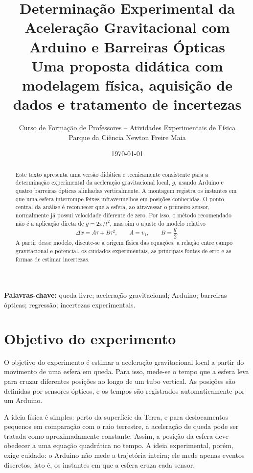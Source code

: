 \documentclass[11pt,a4paper]{article}
\title{\vspace{-1.0cm}\textbf{Determinação Experimental da Aceleração Gravitacional com Arduino e Barreiras Ópticas}\\[0.35em]
\large Uma proposta didática com modelagem física, aquisição de dados e tratamento de incertezas}
\author{Curso de Formação de Professores -- Atividades Experimentais de Física\\Parque da Ciência Newton Freire Maia}
\date{\today}
\begin{document}
\maketitle

\begin{abstract}
Este texto apresenta uma versão didática e tecnicamente consistente para a determinação experimental da aceleração gravitacional local, $g$, usando Arduino e quatro barreiras ópticas alinhadas verticalmente. A montagem registra os instantes em que uma esfera interrompe feixes infravermelhos em posições conhecidas. O ponto central da análise é reconhecer que a esfera, ao atravessar o primeiro sensor, normalmente já possui velocidade diferente de zero. Por isso, o método recomendado não é a aplicação direta de $g=2x/t^2$, mas sim o ajuste do modelo relativo
\[
\Delta x=A\tau+B\tau^2,
\qquad A=v_1,
\qquad B=\frac{g}{2}.
\]
A partir desse modelo, discute-se a origem física das equações, a relação entre campo gravitacional e potencial, os cuidados experimentais, as principais fontes de erro e as formas de estimar incertezas.
\end{abstract}

\textbf{Palavras-chave:} queda livre; aceleração gravitacional; Arduino; barreiras ópticas; regressão; incertezas experimentais.

\tableofcontents
\newpage

\section{Objetivo do experimento}

O objetivo do experimento é estimar a aceleração gravitacional local a partir do movimento de uma esfera em queda. Para isso, mede-se o tempo que a esfera leva para cruzar diferentes posições ao longo de um tubo vertical. As posições são definidas por sensores ópticos, e os tempos são registrados automaticamente por um Arduino.

A ideia física é simples: perto da superfície da Terra, e para deslocamentos pequenos em comparação com o raio terrestre, a aceleração de queda pode ser tratada como aproximadamente constante. Assim, a posição da esfera deve obedecer a uma equação quadrática no tempo. A ideia experimental, porém, exige cuidado: o Arduino não mede a trajetória inteira; ele mede apenas eventos discretos, isto é, os instantes em que a esfera cruza cada sensor.
\end{document}

